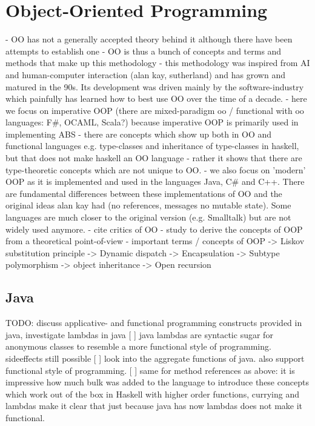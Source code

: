 \chapter{Object-Oriented Programming}
- OO has not a generally accepted theory behind it although there have been attempts to establish one \cite{abadi_theory_1996}
- OO is thus a bunch of concepts and terms and methods that make up this methodology - this methodology was inspired from AI and human-computer interaction (alan kay, sutherland) and has grown and matured in the 90s. Its development was driven mainly by the software-industry which painfully has learned how to best use OO over the time of a decade.
- here we focus on imperative OOP (there are mixed-paradigm oo / functional with oo languages: F\#, OCAML, Scala?) because imperative OOP is primarily used in implementing ABS
- there are concepts which show up both in OO and functional languages e.g. type-classes and inheritance of type-classes in haskell, but that does not make haskell an OO language - rather it shows that there are type-theoretic concepts which are not unique to OO.
- we also focus on 'modern' OOP as it is implemented and used in the languages Java, C\# and C++. There are fundamental differences between these implementations of OO and the original ideas alan kay had (no references, messages no mutable state). Some languages are much closer to the original version (e.g. Smalltalk) but are not widely used anymore.
- cite critics of OO
- study \cite{abadi_theory_1996} to derive the concepts of OOP from a theoretical point-of-view
- important terms / concepts of OOP
	-> Liskov substitution principle
	-> Dynamic dispatch
	-> Encapsulation
	-> Subtype polymorphism
	-> object inheritance 
	-> Open recursion
	
\section{Java}
TODO: discuss applicative- and functional programming constructs provided in java, investigate lambdas in java
[ ] java lambdas are syntactic sugar for anonymous classes to resemble a more functional style of programming. sideeffects still possible
[ ] look into the aggregate functions of java. also support functional style of programming.
[ ] same for method references as above: it is impressive how much bulk was added to the language to introduce these concepts which work out of the box in Haskell with higher order functions, currying and lambdas 
make it clear that just because java has now lambdas does not make it functional. 

